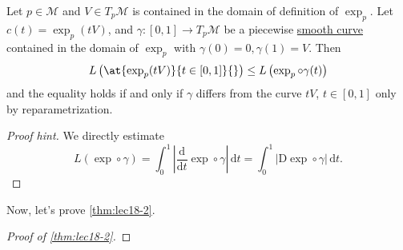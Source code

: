 \begin{corollary}
	Let \(p\in \mathcal{M} \) and \(V\in T_p \mathcal{M} \) is contained in the domain of definition of \(\exp _p\). Let \(c(t) = \exp _p(t V)\), and \(\gamma \colon [0, 1] \to T_p \mathcal{M} \) be a piecewise \hyperref[def:curve]{smooth curve}  contained in the domain of \(\exp _p\) with \(\gamma (0) = 0, \gamma (1) = V\). Then
	\[
		L \left( \at{\exp _p(tV)}{t\in[0, 1]}{}  \right)
		\leq L \left( \exp _p \circ \gamma (t) \right)
	\]
	and the equality holds if and only if \(\gamma \) differs from the curve \(tV\), \(t\in[0, 1]\) only by reparametrization.
\end{corollary}
\begin{proof}[Proof hint]
	We directly estimate
	\[
		L(\exp \circ \gamma )
		= \int_{0}^{1} \left\vert \frac{\mathrm{d}}{\mathrm{d}t} \exp \circ \gamma \right\vert \,\mathrm{d}t
		= \int_{0}^{1} \vert \mathrm{D} \exp \circ \gamma  \vert  \,\mathrm{d}t.
	\]
\end{proof}

Now, let's prove \autoref{thm:lec18-2}.
\begin{proof}[Proof of \autoref{thm:lec18-2}]

\end{proof}